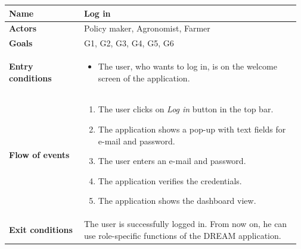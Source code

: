 \begin{table}[H]
    \centering
	\begin{tabular}{@{}p{0.25\linewidth} p{0.72\linewidth}@{}}
\toprule
		\textbf{Name}               & Log in\\
		\midrule
		\textbf{Actors}             & Policy maker, Agronomist, Farmer\\
		\midrule
		\textbf{Goals}              & G1, G2, G3, G4, G5, G6 \\
		\midrule
		
		\textbf{Entry conditions}   & \begin{itemize}[leftmargin=.4cm,noitemsep,topsep=0pt,before=\vspace{-3mm},after=\vspace{-4mm}]
		    \item The user, who wants to log in, is  on the welcome screen of the application.
		\end{itemize}\\
		\midrule
		
		\textbf{Flow of events}     & \begin{enumerate}[leftmargin=.4cm,noitemsep,topsep=0pt,before=\vspace{-3mm},after=\vspace{-4mm}]
		    \item The user clicks on \textit{Log in} button in the top bar.
		    \item The application shows a pop-up with text fields for e-mail and password.
		    \item The user enters an e-mail and password.
		    \item The application verifies the credentials.
		    \item The application shows the dashboard view.
		\end{enumerate}\\
		\midrule
		\textbf{Exit conditions}    & The user is successfully logged in. From now on, he can use role-specific functions of the DREAM application. \\
		\midrule
		

\end{tabular}
\end{table}
